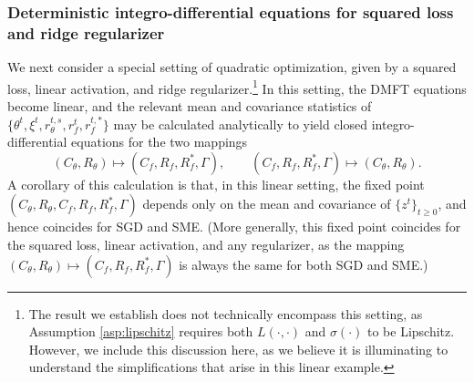 \documentclass[11pt,letterpaper,reqno]{amsart}
\theoremstyle{definition}
\begin{document}
\subsubsection{Deterministic integro-differential equations for squared loss and
ridge regularizer}\label{sec:linear}

We next consider a special setting of quadratic optimization, given by a
squared loss, linear activation, and ridge regularizer.\footnote{The result we establish does not
technically encompass this setting, as Assumption \ref{asp:lipschitz}
requires both $L(\cdot,\cdot)$ and $\sigma(\cdot)$ to be Lipschitz. However, we
include this discussion here, as we believe it is illuminating to understand
the simplifications that arise in this linear example.} In this setting,
the DMFT equations become linear, and the relevant mean and covariance
statistics of
$\{\theta^t,\xi^t,r_\theta^{t,s},r_f^t,r_f^{t,*}\}$ may be calculated
analytically to yield closed integro-differential equations for the two mappings
\[(C_\theta,R_\theta) \mapsto (C_f, R_f, R_f^*,\Gamma),
\qquad (C_f, R_f, R_f^*,\Gamma) \mapsto (C_\theta,R_\theta).\]
A corollary of this calculation is that, in this linear setting, the fixed point
$(C_\theta,R_\theta,C_f, R_f, R_f^*,\Gamma)$ depends only on the mean and
covariance of $\{z^t\}_{t \geq 0}$, and hence coincides for SGD and SME. (More generally, this fixed point coincides for the squared loss, linear activation, and any regularizer, as the mapping $(C_\theta,R_\theta) \mapsto (C_f, R_f, R_f^*,\Gamma)$ is always the same for both SGD and SME.)
\end{document}
